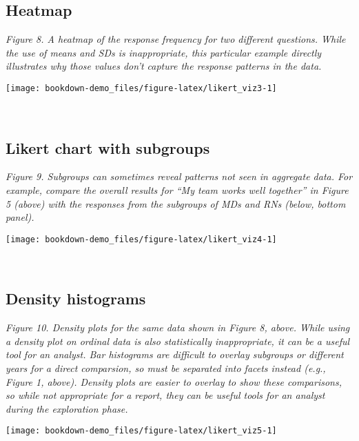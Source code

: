 \documentclass[]{book}
\begin{document}
\subsection{Heatmap}\label{heatmap}

\emph{Figure 8. A heatmap of the response frequency for two different
questions. While the use of means and SDs is inappropriate, this
particular example directly illustrates why those values don't capture
the response patterns in the data.}

\begin{center}\texttt{[image: bookdown-demo\_files/figure-latex/likert\_viz3-1]} \end{center}

~

\subsection{Likert chart with
subgroups}\label{likert-chart-with-subgroups}

\emph{Figure 9. Subgroups can sometimes reveal patterns not seen in
aggregate data. For example, compare the overall results for ``My team
works well together'' in Figure 5 (above) with the responses from the
subgroups of MDs and RNs (below, bottom panel).}

\begin{center}\texttt{[image: bookdown-demo\_files/figure-latex/likert\_viz4-1]} \end{center}

~

\subsection{Density histograms}\label{density-histograms}

\emph{Figure 10. Density plots for the same data shown in Figure 8,
above. While using a density plot on ordinal data is also statistically
inappropriate, it can be a useful tool for an analyst. Bar histograms
are difficult to overlay subgroups or different years for a direct
comparsion, so must be separated into facets instead (e.g., Figure 1,
above). Density plots are easier to overlay to show these comparisons,
so while not appropriate for a report, they can be useful tools for an
analyst during the exploration phase.}

\begin{center}\texttt{[image: bookdown-demo\_files/figure-latex/likert\_viz5-1]} \end{center}
\end{document}
